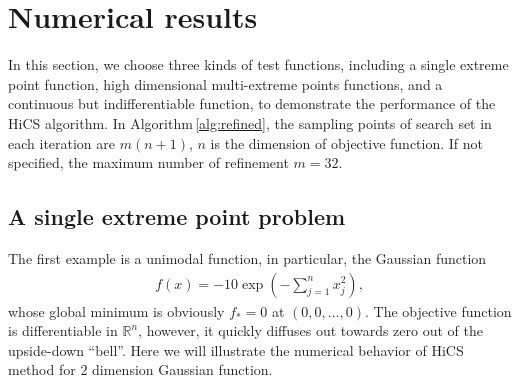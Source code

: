 \documentclass[final,1p,times]{elsarticle}
\def\bbR{\mathbb{R}}
\begin{document}
\section{Numerical results}
\label{sec:experiment}

In this section, we choose three kinds of test functions,
including a single extreme point function, high dimensional
multi-extreme points functions, and a continuous but
indifferentiable function, to demonstrate the performance of the
HiCS algorithm. 
In Algorithm\,\ref{alg:refined}, the sampling points of 
search set in each iteration are $m(n+1)$, $n$ is the dimension
of objective function.  If not specified, the maximum number of
refinement $m=32$.

\subsection{A single extreme point problem}
\label{subsec:gauss}

The first example is a unimodal function, in particular, the Gaussian function
\begin{align}
	f(x) = -10\exp\left(-\sum_{j=1}^n x_j^2 \right),
	\label{eqn:exp1}
\end{align}
whose global minimum is obviously $f_*=0$ at $(0,0,\dots,0)$. 
The objective function is differentiable in $\bbR^n$, however,
it quickly diffuses out towards zero out of the upside-down ``bell''. 
Here we will illustrate the numerical behavior of HiCS method for
$2$ dimension Gaussian function.
\end{document}
